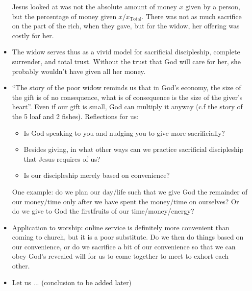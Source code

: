 \begin{itemize}
{  Jesus looked at was not the absolute amount of money $x$ given by a person,
  but the percentage of money given $x/x_{\text{Total}}$.  There was not as
  much sacrifice on the part of the rich, when they gave, but for the widow,
  her offering was costly for her.}
  \item{The widow serves thus as a vivid model for sacrificial discipleship,
  complete surrender, and total trust.  Without the trust that God will care
  for her, she probably wouldn't have given all her money.}
  \item{ ``The story of the poor widow reminds us that in God's economy, the
  size of the gift is of no consequence, what is of consequence is the size
  of the giver's heart''.
  Even if our gift is small, God can multiply it
  anyway (c.f the story of the 5 loaf and 2 fishes).  Reflections for us:
  \begin{itemize}
    \item{Is God speaking to you and nudging you to give more sacrificially?}
    \item{Besides giving, in what other ways can we practice sacrificial
    discipleship that Jesus requires of us?}
    \item{Is our discipleship merely based on convenience?}
  \end{itemize}
  One example: do we plan our day/life such that we give God the remainder of
  our money/time only after we have spent the money/time on ourselves?  Or do
  we give to God the firstfruits of our time/money/energy?}
  \item{Application to worship: online service is definitely more convenient
  than coming to church, but it is a poor substitute.  Do we then do things
  based on our convenience, or do we sacrifice a bit of our convenience so
  that we can obey God's revealed will for us to come together to meet to
  exhort each other.}
  \item{Let us ... (conclusion to be added later)}
\end{itemize}